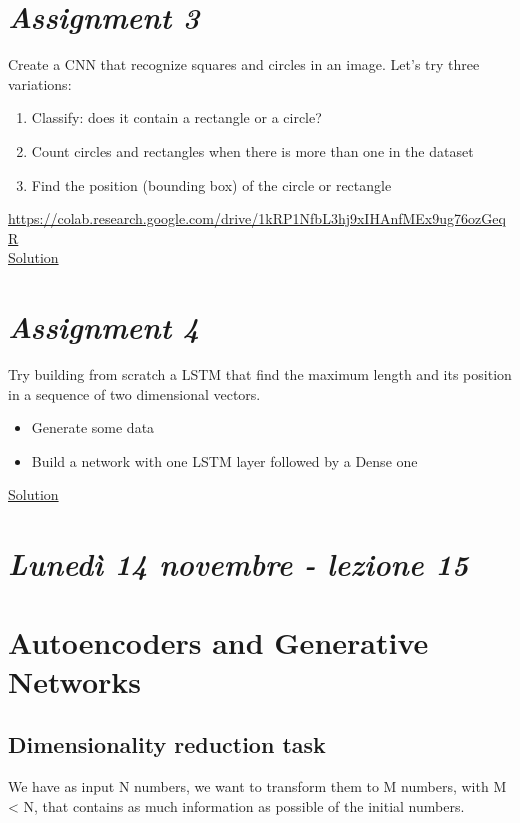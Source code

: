 \section{\textit{Assignment 3}}

Create a CNN that recognize squares and circles in an image. Let’s try three variations:

\begin{enumerate}
	\item Classify: does it contain a rectangle or a circle?
	\item Count circles and rectangles when there is more than one in the dataset
	\item Find the position (bounding box) of the circle or rectangle
\end{enumerate}

\url{https://colab.research.google.com/drive/1kRP1NfbL3hj9xIHAnfMEx9ug76ozGeqR}\\

\href{https://colab.research.google.com/drive/1KHjAsly12wQnrENOgJhF1XKnRFAGmAA6#scrollTo=YiUPPdZ6pNsi}{Solution}


\section{\textit{Assignment 4}}


Try building from scratch a LSTM that find the maximum length and its position in a sequence of two dimensional vectors.\\

\begin{itemize}
	\item Generate some data
	\item Build a network with one LSTM layer followed by a Dense one
\end{itemize}


\href{https://colab.research.google.com/drive/1AyK6r9VG7rV0ZDjqDXu1q0ROEfAAwlU7?usp=sharing}{Solution}


\newpage

\section{\textit{Lunedì 14 novembre - lezione 15}}
\section{Autoencoders and Generative Networks}

\subsection{Dimensionality reduction task}
We have as input N numbers, we want to transform them to M numbers, with M < N, that contains as much information as possible of the initial numbers.\\

